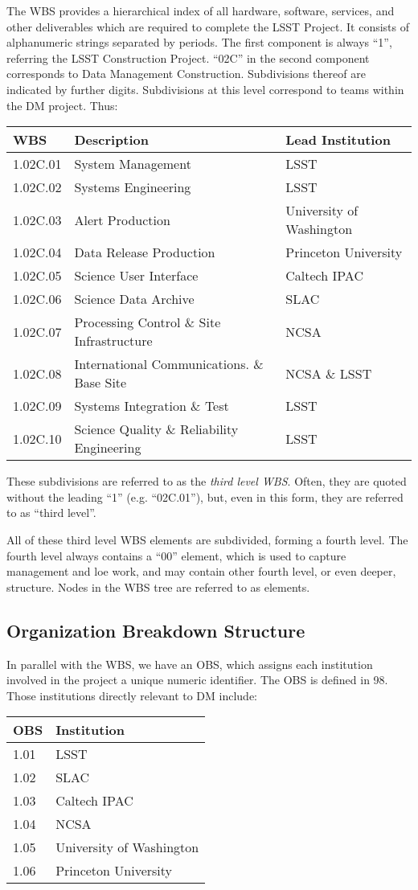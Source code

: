 The WBS provides a hierarchical index of all hardware, software,
services, and other deliverables which are required to complete the LSST
Project. It consists of alphanumeric strings separated by periods. The
first component is always ``1'', referring the LSST Construction
Project. ``02C'' in the second component corresponds to Data Management
Construction. Subdivisions thereof are indicated by further digits.
Subdivisions at this level correspond to teams within the DM project.
Thus:

\begin{longtable}[]{@{}lll@{}}
\hline
WBS & Description & Lead Institution\tabularnewline
\hline
\endhead
1.02C.01 & System Management & LSST\tabularnewline
1.02C.02 & Systems Engineering & LSST\tabularnewline
1.02C.03 & Alert Production & University of Washington\tabularnewline
1.02C.04 & Data Release Production & Princeton University\tabularnewline
1.02C.05 & Science User Interface & Caltech IPAC\tabularnewline
1.02C.06 & Science Data Archive & SLAC\tabularnewline
1.02C.07 & Processing Control \& Site Infrastructure &
NCSA\tabularnewline
1.02C.08 & International Communications. \& Base Site & NCSA \&
LSST\tabularnewline
1.02C.09 & Systems Integration \& Test & LSST\tabularnewline
1.02C.10 & Science Quality \& Reliability Engineering &
LSST\tabularnewline
\hline
\end{longtable}

These subdivisions are referred to as the \emph{third level WBS}. Often,
they are quoted without the leading ``1'' (e.g. ``02C.01''), but, even
in this form, they are referred to as ``third level''.

All of these third level WBS elements are subdivided, forming a fourth
level. The fourth level always contains a ``00'' element, which is used
to capture management and \gls{loe} work, and may contain other fourth level,
or even deeper, structure. Nodes in the WBS tree are referred to as
elements.

\subsection{Organization Breakdown
Structure}\label{organization-breakdown-structure}

In parallel with the WBS, we have an OBS, which assigns each institution
involved in the project a unique numeric identifier. The OBS is defined
in 98. Those institutions directly relevant to DM include:

\begin{longtable}[]{@{}ll@{}}
\hline
OBS & Institution\tabularnewline
\hline
\endhead
1.01 & LSST\tabularnewline
1.02 & SLAC\tabularnewline
1.03 & Caltech IPAC\tabularnewline
1.04 & NCSA\tabularnewline
1.05 & University of Washington\tabularnewline
1.06 & Princeton University\tabularnewline
\hline
\end{longtable}

